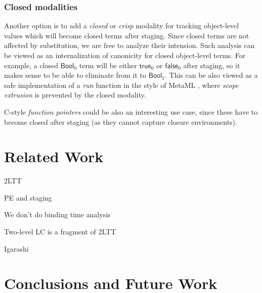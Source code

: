 \documentclass[acmsmall]{acmart}
\newcommand{\msf}[1]{\mathsf{#1}}
\newcommand{\Bool}{\msf{Bool}}
\newcommand{\true}{\msf{true}}
\newcommand{\false}{\msf{false}}
\theoremstyle{remark}
\begin{document}
\subsubsection{Closed modalities}
Another option is to add a \emph{closed} or \emph{crisp} modality
\cite{licata2018internal} for tracking object-level values which will become
closed terms after staging. Since closed terms are not affected by substitution,
we are free to analyze their intension. Such analysis can be viewed as an
internalization of canonicity for closed object-level terms. For example, a
closed $\Bool_0$ term will be either $\true_0$ or $\false_0$ after staging, so
it makes sense to be able to eliminate from it to $\Bool_1$. This can be also
viewed as a safe implementation of a \emph{run} function in the style of MetaML
\cite{TODO}, where \emph{scope extrusion} is prevented by the closed modality.

C-style \emph{function pointers} could be also an interesting use case, since
these have to become closed after staging (as they cannot capture closure
environments).

\section{Related Work}\label{sec:related-work}

2LTT

PE and staging

We don't do binding time analysis

Two-level LC is a fragment of 2LTT

Igarashi


\section{Conclusions and Future Work}\label{sec:conclusions}




\end{document}
